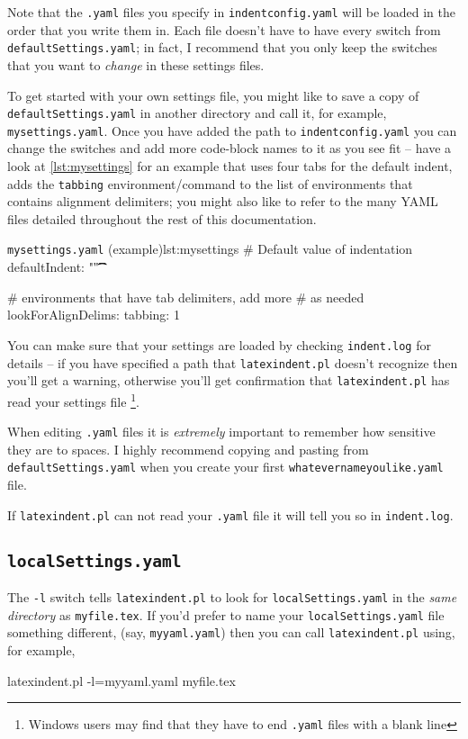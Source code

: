  Note that the \texttt{.yaml} files you specify in \texttt{indentconfig.yaml}
 will be loaded in the order that you write them in. Each file doesn't have
 to have every switch from \texttt{defaultSettings.yaml}; in fact, I recommend
 that you only keep the switches that you want to \emph{change} in these
 settings files.

 To get started with your own settings file, you might like to save a copy of
 \texttt{defaultSettings.yaml} in another directory and call it, for
 example, \texttt{mysettings.yaml}. Once you have added the path to \texttt{indentconfig.yaml}
 you can change the switches and add more code-block names to it
 as you see fit -- have a look at \cref{lst:mysettings} for an example
 that uses four tabs for the default indent, adds the \texttt{tabbing}
 environment/command to the list of environments that contains alignment delimiters; you might also like to
 refer to the many YAML files detailed throughout the rest of this documentation.

 \begin{yaml}{\texttt{mysettings.yaml} (example)}{lst:mysettings}
# Default value of indentation
defaultIndent: "\t\t\t\t"

# environments that have tab delimiters, add more
# as needed
lookForAlignDelims:
    tabbing: 1
\end{yaml}

 You can make sure that your settings are loaded by checking \texttt{indent.log}
 for details -- if you have specified a path that \texttt{latexindent.pl} doesn't
 recognize then you'll get a warning, otherwise you'll get confirmation that
 \texttt{latexindent.pl} has read your settings file \footnote{Windows users
	 may find that they have to end \texttt{.yaml} files with a blank line}.

 \begin{warning}
	 When editing \texttt{.yaml} files it is \emph{extremely} important
	 to remember how sensitive they are to spaces. I highly recommend copying
	 and pasting from \texttt{defaultSettings.yaml} when you create your
	 first \texttt{whatevernameyoulike.yaml} file.

	 If \texttt{latexindent.pl} can not read your \texttt{.yaml} file it
	 will tell you so in \texttt{indent.log}.
 \end{warning}

\subsection{\texttt{localSettings.yaml}}\label{sec:localsettings}
	The \texttt{-l} switch tells \texttt{latexindent.pl} to look for \texttt{localSettings.yaml} in the
	\emph{same directory} as \texttt{myfile.tex}.  If you'd prefer to name your \texttt{localSettings.yaml} file something
	different, (say, \texttt{myyaml.yaml}) then
	you can call \texttt{latexindent.pl} using, for example,
	\begin{commandshell}
latexindent.pl -l=myyaml.yaml myfile.tex
\end{commandshell}

